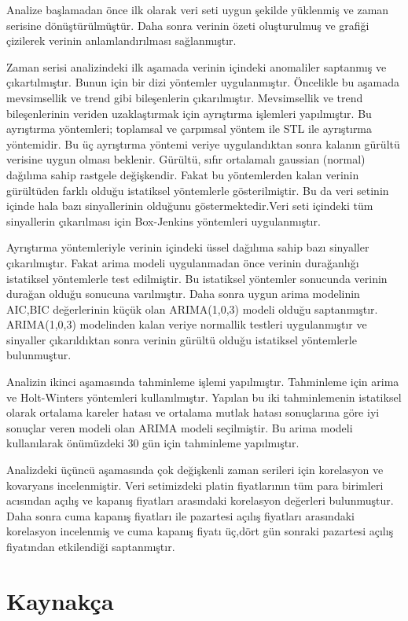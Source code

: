\documentclass[11pt]{article}
\begin{document}
Analize başlamadan önce ilk olarak veri seti uygun şekilde yüklenmiş ve
zaman serisine dönüştürülmüştür. Daha sonra verinin özeti oluşturulmuş
ve grafiği çizilerek verinin anlamlandırılması sağlanmıştır.

Zaman serisi analizindeki ilk aşamada verinin içindeki anomaliler
saptanmış ve çıkartılmıştır. Bunun için bir dizi yöntemler
uygulanmıştır. Öncelikle bu aşamada mevsimsellik ve trend gibi
bileşenlerin çıkarılmıştır. Mevsimsellik ve trend bileşenlerinin veriden
uzaklaştırmak için ayrıştırma işlemleri yapılmıştır. Bu ayrıştırma
yöntemleri; toplamsal ve çarpımsal yöntem ile STL ile ayrıştırma
yöntemidir. Bu üç ayrıştırma yöntemi veriye uygulandıktan sonra kalanın
gürültü verisine uygun olması beklenir. Gürültü, sıfır ortalamalı
gaussian (normal) dağılıma sahip rastgele değişkendir. Fakat bu
yöntemlerden kalan verinin gürültüden farklı olduğu istatiksel
yöntemlerle gösterilmiştir. Bu da veri setinin içinde hala bazı
sinyallerinin olduğunu göstermektedir.Veri seti içindeki tüm sinyallerin
çıkarılması için Box-Jenkins yöntemleri uygulanmıştır.

Ayrıştırma yöntemleriyle verinin içindeki üssel dağılıma sahip bazı
sinyaller çıkarılmıştır. Fakat arima modeli uygulanmadan önce verinin
durağanlığı istatiksel yöntemlerle test edilmiştir. Bu istatiksel
yöntemler sonucunda verinin durağan olduğu sonucuna varılmıştır. Daha
sonra uygun arima modelinin AIC,BIC değerlerinin küçük olan ARIMA(1,0,3)
modeli olduğu saptanmıştır. ARIMA(1,0,3) modelinden kalan veriye
normallik testleri uygulanmıştır ve sinyaller çıkarıldıktan sonra
verinin gürültü olduğu istatiksel yöntemlerle bulunmuştur.

Analizin ikinci aşamasında tahminleme işlemi yapılmıştır. Tahminleme
için arima ve Holt-Winters yöntemleri kullanılmıştır. Yapılan bu iki
tahminlemenin istatiksel olarak ortalama kareler hatası ve ortalama
mutlak hatası sonuçlarına göre iyi sonuçlar veren modeli olan ARIMA
modeli seçilmiştir. Bu arima modeli kullanılarak önümüzdeki 30 gün için
tahminleme yapılmıştır.

Analizdeki üçüncü aşamasında çok değişkenli zaman serileri için
korelasyon ve kovaryans incelenmiştir. Veri setimizdeki platin
fiyatlarının tüm para birimleri acısından açılış ve kapanış fiyatları
arasındaki korelasyon değerleri bulunmuştur. Daha sonra cuma kapanış
fiyatları ile pazartesi açılış fiyatları arasındaki korelasyon
incelenmiş ve cuma kapanış fiyatı üç,dört gün sonraki pazartesi açılış
fiyatından etkilendiği saptanmıştır.
\pagebreak
    \section{Kaynakça}\label{kaynakuxe7a}
\end{document}
